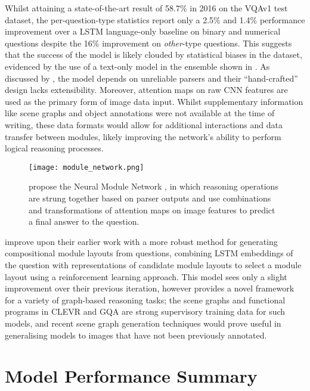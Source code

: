Whilst attaining a state-of-the-art result of 58.7\% in 2016 on the VQAv1 test dataset, the per-question-type statistics report only a 2.5\% and 1.4\% performance improvement over a LSTM \cite{hochreiter1997long} language-only baseline on binary and numerical questions despite the 16\% improvement on \textit{other}-type questions. This suggests that the success of the model is likely clouded by statistical biases in the dataset, evidenced by the use of a text-only model in the ensemble shown in \figureautorefname{ \ref{fig:andreas2016neural_neural_module_network}}. As discussed by \citeauthor{hudson2018compositional}, the model depends on unreliable parsers and their ``hand-crafted'' design lacks extensibility. Moreover, attention maps on raw CNN features are used as the primary form of image data input. Whilst supplementary information like scene graphs and object annotations were not available at the time of writing, these data formats would allow for additional interactions and data transfer between modules, likely improving the network's ability to perform logical reasoning processes.

\begin{figure}[H]
    \centering
    \texttt{[image: module\_network.png]}
    \caption[A Neural Module Network VQA Model \cite{andreas2016neural}]{\citeauthor{andreas2016neural} propose the Neural Module Network \cite{andreas2016neural}, in which reasoning operations are strung together based on parser outputs and use combinations and transformations of attention maps on image features to predict a final answer to the question.}
    \label{fig:andreas2016neural_neural_module_network}
\end{figure}

\citeauthor{andreas2016learning} \cite{andreas2016learning} improve upon their earlier work with a more robust method for generating compositional module layouts from questions, combining LSTM embeddings of the question with representations of candidate module layouts to select a module layout using a reinforcement learning approach. This model sees only a slight improvement over their previous iteration, however provides a novel framework for a variety of graph-based reasoning tasks; the scene graphs and functional programs in CLEVR and GQA are strong supervisory training data for such models, and recent scene graph generation techniques would prove useful in generalising models to images that have not been previously annotated.

\section{Model Performance Summary}

